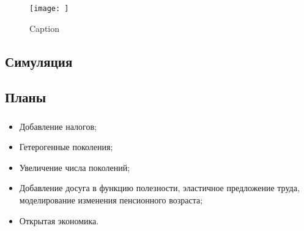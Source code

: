 \documentclass[c, dvipsnames]{beamer}  %
\begin{document}
\begin{frame}
 \frametitle{\insertsection}
 \framesubtitle{\insertsubsection}

\begin{figure}
    \centering
    \texttt{[image: ]}
    \caption{Caption}
    \label{fig:my_label}
\end{figure}
\end{frame}


\subsection{Симуляция}
\begin{frame}
 \frametitle{\insertsection}
 \framesubtitle{\insertsubsection}

\end{frame}
\subsection{Планы}
\begin{frame}
 \frametitle{\insertsection}
 \framesubtitle{\insertsubsection}
\begin{itemize}
    \item Добавление налогов;
    \item Гетерогенные поколения;
    \item Увеличение числа поколений;
    \item Добавление досуга в функцию полезности, эластичное предложение труда, моделирование изменения пенсионного возраста;
    \item Открытая экономика.
\end{itemize}
\end{frame}
\end{document}
